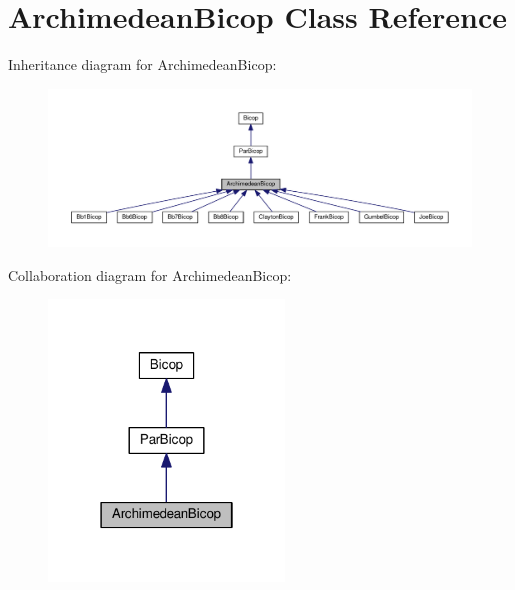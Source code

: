 \hypertarget{class_archimedean_bicop}{}\section{Archimedean\+Bicop Class Reference}
\label{class_archimedean_bicop}


Inheritance diagram for Archimedean\+Bicop\+:\nopagebreak
\begin{figure}[H]
\begin{center}
\leavevmode
\includegraphics[width=350pt]{class_archimedean_bicop__inherit__graph}
\end{center}
\end{figure}


Collaboration diagram for Archimedean\+Bicop\+:\nopagebreak
\begin{figure}[H]
\begin{center}
\leavevmode
\includegraphics[width=178pt]{class_archimedean_bicop__coll__graph}
\end{center}
\end{figure}
